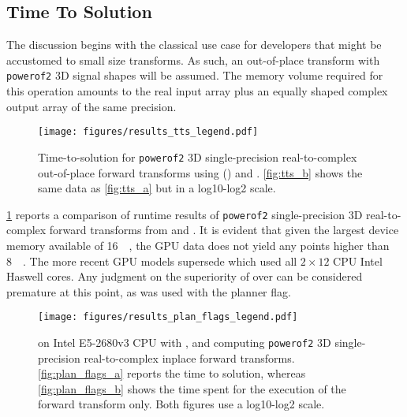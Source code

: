 \subsection{Time To Solution}
\label{ssec:tts}

The discussion begins with the classical use case for developers that might be accustomed to small size transforms. As such, an out-of-place transform with \texttt{powerof2} 3D signal shapes will be assumed. The memory volume required for this operation amounts to the real input array plus an equally shaped complex output array of the same precision.

\begin{figure}[!htbp]
  \centering
  \texttt{[image: figures/results\_tts\_legend.pdf]}\vspace{-1em}
  \hfill
  \caption{Time-to-solution for \texttt{powerof2} 3D single-precision real-to-complex out-of-place forward transforms using \fftw{} () and \cufft{}. \cref{fig:tts_b} shows the same data as \cref{fig:tts_a} but in a log10-log2 scale.}
  \label{fig:tts}
\end{figure}

\cref{fig:tts} reports a comparison of runtime results of \texttt{powerof2} single-precision 3D real-to-complex forward transforms from \fftw{} and \cufft{}. It is evident that given the largest device memory available of  \SI{16}{\gibi\byte}, the GPU data does not yield any points higher than \SI{8}{\gibi\byte}. The more recent GPU models supersede \fftw{} which used all $2{\times}12$ CPU Intel Haswell cores. Any judgment on the superiority of \cufft{} over \fftw{} can be considered premature at this point, as \fftw{} was used with the  planner flag.

\begin{figure}[!htbp]
  \centering
  \texttt{[image: figures/results\_plan\_flags\_legend.pdf]}\vspace{-1em}
  \hfill
  \caption{\fftw{} on Intel E5-2680v3 CPU with ,  and  computing \texttt{powerof2} 3D single-precision real-to-complex inplace forward transforms. \cref{fig:plan_flags_a} reports the time to solution, whereas \cref{fig:plan_flags_b} shows the time spent for the execution of the forward transform only. Both figures use a log10-log2 scale.}
  \label{fig:fftw_plan_flags}
\end{figure}


